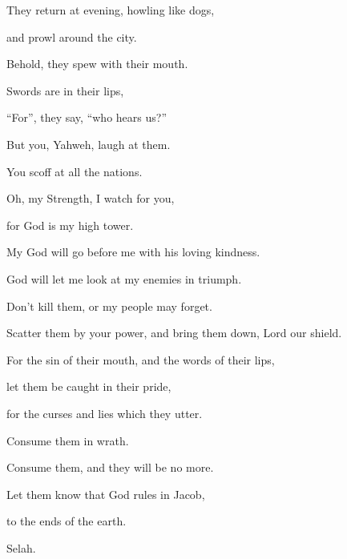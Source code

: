 {\par }
{\Q {}They return at evening, howling like dogs,
\par }{\QB and prowl around the city.
\par }{\Q {}Behold, they spew with their mouth.
\par }{\QB Swords are in their lips,
\par }{\QB “For”, they say, “who hears us?”
\par }{\Q {}But you, Yahweh, laugh at them.
\par }{\QB You scoff at all the nations.
\par }{\Q {}Oh, my Strength, I watch for you,
\par }{\QB for God is my high tower.
\par }{\Q {}My God will go before me with his loving kindness.
\par }{\QB God will let me look at my enemies in triumph.
\par }{\Q {}Don’t kill them, or my people may forget.
\par }{\QB Scatter them by your power, and bring them down, Lord our shield.
\par }{\Q {}For the sin of their mouth, and the words of their lips,
\par }{\QB let them be caught in their pride,
\par }{\QB for the curses and lies which they utter.
\par }{\Q {}Consume them in wrath.
\par }{\QB Consume them, and they will be no more.
\par }{\Q Let them know that God rules in Jacob,
\par }{\QB to the ends of the earth.
\par }{\QS Selah.\par }
